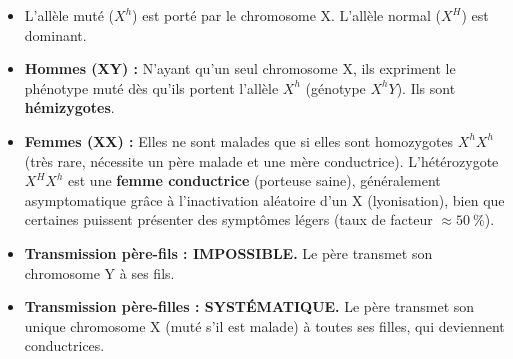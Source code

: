 \documentclass[11pt]{article}
\begin{document}
\begin{propriete}
\begin{itemize}
    \item L'allèle muté ($X^h$) est porté par le chromosome X. L'allèle normal ($X^H$) est dominant.
    \item \textbf{Hommes (XY) :} N'ayant qu'un seul chromosome X, ils expriment le phénotype muté dès qu'ils portent l'allèle $X^h$ (génotype $X^h Y$). Ils sont \textbf{hémizygotes}.
    \item \textbf{Femmes (XX) :} Elles ne sont malades que si elles sont homozygotes $X^h X^h$ (très rare, nécessite un père malade et une mère conductrice). L'hétérozygote $X^H X^h$ est une \textbf{femme conductrice} (porteuse saine), généralement asymptomatique grâce à l'inactivation aléatoire d'un X (lyonisation), bien que certaines puissent présenter des symptômes légers (taux de facteur $\approx 50\ \%$).
    \item \textbf{Transmission père-fils : IMPOSSIBLE.} Le père transmet son chromosome Y à ses fils.
    \item \textbf{Transmission père-filles : SYSTÉMATIQUE.} Le père transmet son unique chromosome X (muté s'il est malade) à toutes ses filles, qui deviennent conductrices.
\end{itemize}
\end{propriete}
\end{document}
